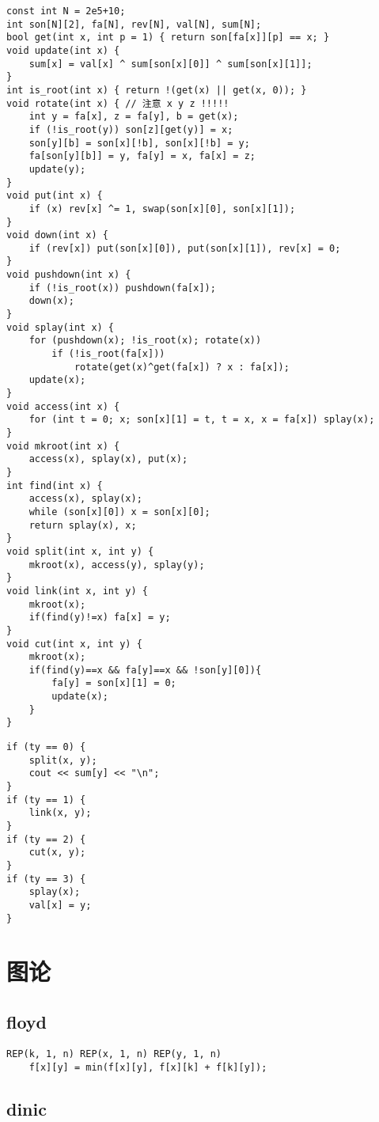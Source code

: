 \documentclass[a4paper,landscape,twocolumn]{ctexart}
\begin{document}
\begin{lstlisting}
const int N = 2e5+10;
int son[N][2], fa[N], rev[N], val[N], sum[N];
bool get(int x, int p = 1) { return son[fa[x]][p] == x; }
void update(int x) {
	sum[x] = val[x] ^ sum[son[x][0]] ^ sum[son[x][1]];
}
int is_root(int x) { return !(get(x) || get(x, 0)); }
void rotate(int x) { // 注意 x y z !!!!!
	int y = fa[x], z = fa[y], b = get(x);
	if (!is_root(y)) son[z][get(y)] = x;
	son[y][b] = son[x][!b], son[x][!b] = y;
	fa[son[y][b]] = y, fa[y] = x, fa[x] = z;
	update(y);
}
void put(int x) {
	if (x) rev[x] ^= 1, swap(son[x][0], son[x][1]);
}
void down(int x) {
	if (rev[x]) put(son[x][0]), put(son[x][1]), rev[x] = 0;
}
void pushdown(int x) {
	if (!is_root(x)) pushdown(fa[x]);
	down(x);
}
void splay(int x) {
	for (pushdown(x); !is_root(x); rotate(x))
		if (!is_root(fa[x]))
			rotate(get(x)^get(fa[x]) ? x : fa[x]);
	update(x);
}
void access(int x) {
	for (int t = 0; x; son[x][1] = t, t = x, x = fa[x]) splay(x);
}
void mkroot(int x) {
	access(x), splay(x), put(x);
}
int find(int x) {
	access(x), splay(x);
	while (son[x][0]) x = son[x][0];
	return splay(x), x;
}
void split(int x, int y) {
	mkroot(x), access(y), splay(y);
}
void link(int x, int y) {
	mkroot(x);
	if(find(y)!=x) fa[x] = y;
}
void cut(int x, int y) {
	mkroot(x);
	if(find(y)==x && fa[y]==x && !son[y][0]){
		fa[y] = son[x][1] = 0;
		update(x);
	}
}
\end{lstlisting}

\begin{lstlisting}
if (ty == 0) {
	split(x, y);
	cout << sum[y] << "\n";
}
if (ty == 1) {
	link(x, y);
}
if (ty == 2) {
	cut(x, y);
}
if (ty == 3) {
	splay(x);
	val[x] = y;
}
\end{lstlisting}

\section{图论}

\subsection{floyd}

\begin{lstlisting}
REP(k, 1, n) REP(x, 1, n) REP(y, 1, n)
	f[x][y] = min(f[x][y], f[x][k] + f[k][y]);
\end{lstlisting}

\subsection{dinic}
\end{document}
